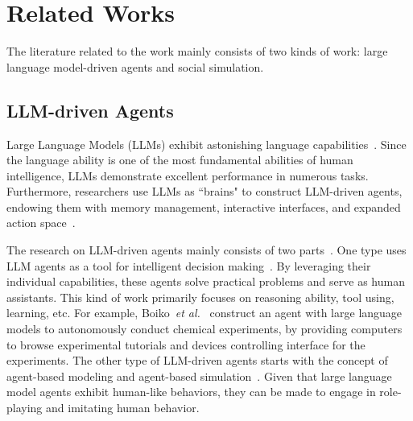 







\section{Related Works}
The literature related to the work mainly consists of two kinds of work: large language model-driven agents and social simulation.

\subsection{LLM-driven Agents}

Large Language Models (LLMs) exhibit astonishing language capabilities~\cite{wang2024survey}. Since the language ability is one of the most fundamental abilities of human intelligence, LLMs demonstrate excellent performance in numerous tasks. Furthermore, researchers use LLMs as ``brains" to construct LLM-driven agents, endowing them with memory management, interactive interfaces, and expanded action space~\cite{kwon2023efficient}.

The research on LLM-driven agents mainly consists of two parts~\cite{xi2023rise}. One type uses LLM agents as a tool for intelligent decision making~\cite{zhang2024large,ruan2023tptu,huang2023benchmarking}. By leveraging their individual capabilities, these agents solve practical problems and serve as human assistants. This kind of work primarily focuses on reasoning ability, tool using, learning, etc.
For example, Boiko~\textit{et al.}~\cite{boiko2023autonomous} construct an agent with large language models to autonomously conduct chemical experiments, by providing computers to browse experimental tutorials and devices controlling interface for the experiments.
The other type of LLM-driven agents starts with the concept of agent-based modeling and agent-based simulation~\cite{li2024econagent,gao2023s,gao2024large}. Given that large language model agents exhibit human-like behaviors, they can be made to engage in role-playing and imitating human behavior. 

